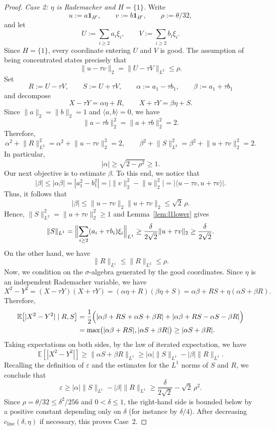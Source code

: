 \documentclass[11pt]{amsart}
\numberwithin{equation}{section}
\theoremstyle{definition}
\theoremstyle{remark}
\newcommand{\E}{\mathbb E}
\newcommand{\eps}{\varepsilon}
\newcommand{\abs}[1]{\lvert #1 \rvert}
\newcommand{\norm}[1]{\lVert #1 \rVert}
\newcommand{\ip}[2]{\langle #1,#2\rangle}
\begin{document}
\begin{proof}
\noindent\emph{Case 2: $\eta$ is Rademacher and $H=\{1\}$.}
Write
\[
u:=a\mathbf 1_{H^c},
\qquad
v:=b\mathbf 1_{H^c},
\qquad
\rho:=\theta/32,
\]
and let
\[
U:=\sum_{i\ge2} a_i\xi_i,
\qquad
V:=\sum_{i\ge2} b_i\xi_i.
\]
Since $H=\{1\}$, every coordinate entering $U$ and $V$ is good.  The
 assumption of being concentrated states precisely that
\[
\norm{u-\tau v}_2=\norm{U-\tau V}_{L^2}\le \rho.
\]
Set
\[
R:=U-\tau V,
\qquad
S:=U+\tau V,
\qquad
\alpha:=a_1-\tau b_1,
\qquad
\beta:=a_1+\tau b_1
\]
and decompose
\[
X-\tau Y=\alpha\eta+R,
\qquad
X+\tau Y=\beta\eta+S.
\]
Since $\norm{a}_2=\norm{b}_2=1$ and $\ip{a}{b}=0$, we have
\[
\norm{a-\tau b}_2^2=\norm{a+\tau b}_2^2=2.
\]
Therefore,
\[
\alpha^2+\norm{R}_{L^2}^2
=\alpha^2+\norm{u-\tau v}_2^2
=2,
\qquad
\beta^2+\norm{S}_{L^2}^2
=\beta^2+\norm{u+\tau v}_2^2
=2.
\]
In particular,
\[
|\alpha|\ge \sqrt{2-\rho^2}\ge1.
\]
Our next objective is to estimate $\beta$. To this end, we notice that
\[
|\beta|\le |\alpha\beta|
=|a_1^2-b_1^2|
=\bigl|\norm{v}_2^2-\norm{u}_2^2\bigr|
=\bigl|\langle u-\tau v,u+\tau v\rangle\bigr|.
\]
Thus, it follows that
\[
|\beta|
\le \norm{u-\tau v}_2\norm{u+\tau v}_2
\le \sqrt2\,\rho.
\]
Hence, $\norm{S}_{L^2}^2 = \|u+\tau v\|_2^2\ge1$ and Lemma~\ref{lem:l1lower} gives
\[
\norm{S}_{L^1}
=\Bigl\|\sum_{i\ge2}(a_i+\tau b_i)\xi_i\Bigr\|_{L^1}
\ge \frac{\delta}{2\sqrt2}\norm{u+\tau v}_2
\ge \frac{\delta}{2\sqrt2}.
\]
On the other hand, we have
\[
\norm{R}_{L^1}\le \norm{R}_{L^2}\le \rho.
\]
Now, we condition on the $\sigma$-algebra generated by the good coordinates.  Since
$\eta$ is an independent Rademacher variable, we have
\[
X^2-Y^2
=(X-\tau Y)(X+\tau Y)
=(\alpha\eta+R)(\beta\eta+S)
=\alpha\beta+RS+\eta(\alpha S+\beta R).
\]
Therefore,
\begin{align*}
    \E\bigl[\abs{X^2-Y^2}\mid R,S\bigr]
&=\frac12\Bigl(
\abs{\alpha\beta+RS+\alpha S+\beta R}
+
\abs{\alpha\beta+RS-\alpha S-\beta R}
\Bigr)
\\
&=\max\bigl(\abs{\alpha\beta+RS},\abs{\alpha S+\beta R}\bigr)
\ge \abs{\alpha S+\beta R}.
\end{align*}
Taking expectations on both sides, by the law of iterated expectation, we have 
\begin{equation*}
\E[|X^2-Y^2|]\ge \|\alpha S+\beta R\|_{L^1}\ge  |\alpha|\|S\|_{L^1}-|\beta|\|R\|_{L^1}.
\end{equation*}
Recalling the definition of $\varepsilon$ and the estimates for the $L^1$ norms of $S$ and $R$, we conclude that
\[
\eps
\ge |\alpha|\norm{S}_{L^1}-|\beta|\norm{R}_{L^1}
\ge \frac{\delta}{2\sqrt2}-\sqrt2\,\rho^2.
\]
Since $\rho=\theta/32\le \delta^2/256$ and $0<\delta\le1$, the right-hand side
is bounded below by a positive constant depending only on $\delta$ (for
instance by $\delta/4$).  After decreasing
$c_{\mathrm{line}}(\delta,\eta)$ if necessary, this proves Case~2.
\end{proof}
\end{document}
